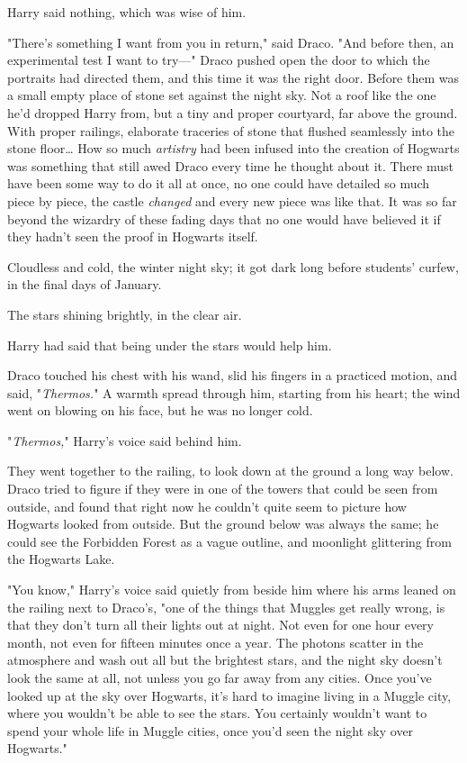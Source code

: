 Harry said nothing, which was wise of him.

"There's something I want from you in return," said Draco. "And before then, an 
experimental test I want to try---"
\sbreak
Draco pushed open the door to which the portraits had directed them, and this 
time it was the right door. Before them was a small empty place of stone set 
against the night sky. Not a roof like the one he'd dropped Harry from, but a 
tiny and proper courtyard, far above the ground. With proper railings, 
elaborate traceries of stone that flushed seamlessly into the stone 
floor{\ldots} How so much \emph{artistry} had been infused into the creation of 
Hogwarts was something that still awed Draco every time he thought about it. 
There must have been some way to do it all at once, no one could have detailed 
so much piece by piece, the castle \emph{changed} and every new piece was like 
that. It was so far beyond the wizardry of these fading days that no one would 
have believed it if they hadn't seen the proof in Hogwarts itself.

Cloudless and cold, the winter night sky; it got dark long before students' 
curfew, in the final days of January.

The stars shining brightly, in the clear air.

Harry had said that being under the stars would help him.

Draco touched his chest with his wand, slid his fingers in a practiced motion, 
and said, "\emph{Thermos.}" A warmth spread through him, starting from his 
heart; the wind went on blowing on his face, but he was no longer cold.

"\emph{Thermos,}" Harry's voice said behind him.

They went together to the railing, to look down at the ground a long way below. 
Draco tried to figure if they were in one of the towers that could be seen from 
outside, and found that right now he couldn't quite seem to picture how 
Hogwarts looked from outside. But the ground below was always the same; he 
could see the Forbidden Forest as a vague outline, and moonlight glittering 
from the Hogwarts Lake.

"You know," Harry's voice said quietly from beside him where his arms leaned on 
the railing next to Draco's, "one of the things that Muggles get really wrong, 
is that they don't turn all their lights out at night. Not even for one hour 
every month, not even for fifteen minutes once a year. The photons scatter in 
the atmosphere and wash out all but the brightest stars, and the night sky 
doesn't look the same at all, not unless you go far away from any cities. Once 
you've looked up at the sky over Hogwarts, it's hard to imagine living in a 
Muggle city, where you wouldn't be able to see the stars. You certainly 
wouldn't want to spend your whole life in Muggle cities, once you'd seen the 
night sky over Hogwarts."

